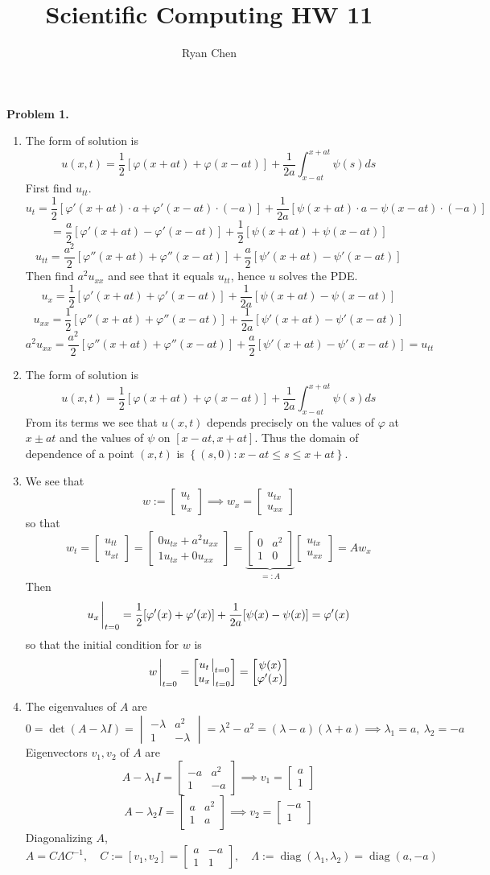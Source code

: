 \documentclass{article}
\title{Scientific Computing HW 11}
\author{Ryan Chen}
\def\tbf#1{\textbf{#1}}
\newcommand{\brc}[1]{\left\{#1\right\}}
\newcommand{\m}[2][b]{\begin{#1matrix}#2\end{#1matrix}}
\newcommand{\vp}{\varphi}
\newcommand{\inv}{^{-1}}
\newcommand{\imp}{\implies}
\DeclareMathOperator{\diag}{diag}
\begin{document}
	
\maketitle



\tbf{Problem 1.}

\begin{enumerate}[label=(\alph*)]
	
\item The form of solution is
$$u(x,t) = \frac12[\vp(x+at)+\vp(x-at)] + \frac{1}{2a}\int_{x-at}^{x+at}\psi(s)ds$$
First find $u_{tt}$.
$$u_t = \frac12[\vp'(x+at)\cdot a+\vp'(x-at)\cdot(-a)] + \frac{1}{2a}[\psi(x+at)\cdot a-\psi(x-at)\cdot(-a)]$$
$$= \frac{a}{2}[\vp'(x+at)-\vp'(x-at)] + \frac12[\psi(x+at)+\psi(x-at)]$$
$$u_{tt} = \frac{a^2}{2}[\vp''(x+at)+\vp''(x-at)] + \frac a2[\psi'(x+at)-\psi'(x-at)]$$
Then find $a^2u_{xx}$ and see that it equals $u_{tt}$, hence $u$ solves the PDE.
$$u_x = \frac12[\vp'(x+at)+\vp'(x-at)] + \frac{1}{2a}[\psi(x+at)-\psi(x-at)]$$
$$u_{xx} = \frac12[\vp''(x+at)+\vp''(x-at)] + \frac{1}{2a}[\psi'(x+at)-\psi'(x-at)]$$
$$a^2u_{xx} = \frac{a^2}{2}[\vp''(x+at)+\vp''(x-at)] + \frac{a}{2}[\psi'(x+at)-\psi'(x-at)] = u_{tt}$$


\item The form of solution is
$$u(x,t) = \frac12[\vp(x+at)+\vp(x-at)] + \frac{1}{2a}\int_{x-at}^{x+at}\psi(s)ds$$
From its terms we see that $u(x,t)$ depends precisely on the values of $\vp$ at $x\pm at$ and the values of $\psi$ on $[x-at,x+at]$. Thus the domain of dependence of a point $(x,t)$ is $\brc{(s,0):x-at\le s\le x+at}$.


\item We see that
$$w := \m{u_t \\ u_x}
\imp w_x = \m{u_{tx} \\ u_{xx}}$$
so that
$$w_t = \m{u_{tt} \\ u_{xt}}
= \m{0u_{tx}+a^2u_{xx} \\ 1u_{tx}+0u_{xx}}
= \underbrace{\m{0 & a^2 \\ 1 & 0}}_{=:A}\m{u_{tx} \\ u_{xx}}
= Aw_x$$
Then
$$u_x\eval_{t=0} = \frac12[\vp'(x)+\vp'(x)] + \frac{1}{2a}[\psi(x)-\psi(x)]
= \vp'(x)$$
so that the initial condition for $w$ is
$$w\eval_{t=0} = \m{u_t\eval_{t=0} \\ u_x\eval_{t=0}}
= \m{\psi(x) \\ \vp'(x)}$$


\item The eigenvalues of $A$ are
$$0 = \det(A-\lambda I)
= \m[v]{-\lambda & a^2 \\ 1 & -\lambda}
= \lambda^2 - a^2
= (\lambda-a)(\lambda+a)
\imp \lambda_1 = a,~\lambda_2 = -a$$
Eigenvectors $v_1,v_2$ of $A$ are
$$A-\lambda_1I = \m{-a & a^2 \\ 1 & -a}
\imp v_1 = \m{a \\ 1}$$
$$A-\lambda_2I = \m{a & a^2 \\ 1 & a}
\imp v_2 = \m{-a \\ 1}$$
Diagonalizing $A$,
$$A = C\Lambda C\inv,
\quad C := [v_1,v_2] = \m{a & -a \\ 1 & 1},
\quad \Lambda := \diag(\lambda_1,\lambda_2) = \diag(a,-a)$$


\end{enumerate}
\end{document}
